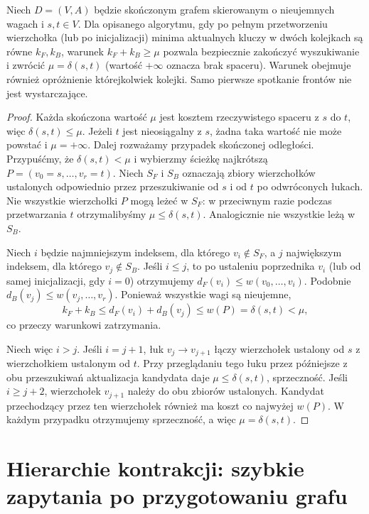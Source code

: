 \begin{stwierdzenie}
\label{prop:tg-weighted-bidir}
Niech $D=(V,A)$ będzie skończonym grafem skierowanym
o nieujemnych wagach i $s,t\in V$.
Dla opisanego algorytmu, gdy po pełnym przetworzeniu
wierzchołka (lub po inicjalizacji) minima aktualnych
kluczy w dwóch kolejkach są równe $k_F,k_B$,
warunek $k_F+k_B\geq\mu$
pozwala bezpiecznie
zakończyć wyszukiwanie
i zwrócić $\mu=\delta(s,t)$ (wartość $+\infty$
oznacza brak spaceru). Warunek obejmuje również
opróżnienie którejkolwiek kolejki.
Samo pierwsze spotkanie
frontów nie jest wystarczające.
\end{stwierdzenie}
\begin{proof}
Każda skończona wartość $\mu$ jest kosztem rzeczywistego
spaceru z $s$ do $t$, więc $\delta(s,t)\leq\mu$.
Jeżeli $t$ jest nieosiągalny z $s$, żadna taka wartość
nie może powstać i $\mu=+\infty$. Dalej rozważamy
przypadek skończonej odległości.
Przypuśćmy, że $\delta(s,t)<\mu$ i wybierzmy
ścieżkę najkrótszą $P=(v_0=s,\ldots,v_r=t)$.
Niech $S_F$ i $S_B$ oznaczają zbiory wierzchołków
ustalonych odpowiednio przez przeszukiwanie od $s$
i od $t$ po odwróconych łukach.
Nie wszystkie wierzchołki $P$ mogą leżeć w $S_F$:
w przeciwnym razie podczas przetwarzania $t$
otrzymalibyśmy $\mu\leq\delta(s,t)$.
Analogicznie nie wszystkie leżą w $S_B$.

Niech $i$ będzie najmniejszym indeksem, dla którego
$v_i\notin S_F$, a $j$ największym indeksem, dla
którego $v_j\notin S_B$. Jeśli $i\leq j$, to po
ustaleniu poprzednika $v_i$ (lub od samej inicjalizacji,
gdy $i=0$) otrzymujemy
$d_F(v_i)\leq w(v_0,\ldots,v_i)$.
Podobnie
$d_B(v_j)\leq w(v_j,\ldots,v_r)$.
Ponieważ wszystkie wagi są nieujemne,
\[
k_F+k_B\leq d_F(v_i)+d_B(v_j)
\leq w(P)=\delta(s,t)<\mu,
\]
co przeczy warunkowi zatrzymania.

Niech więc $i>j$. Jeśli $i=j+1$,
łuk $v_j\to v_{j+1}$ łączy wierzchołek
ustalony od $s$ z wierzchołkiem ustalonym
od $t$. Przy przeglądaniu tego łuku
przez późniejsze z obu przeszukiwań
aktualizacja kandydata daje
$\mu\leq\delta(s,t)$, sprzeczność.
Jeśli $i\geq j+2$, wierzchołek $v_{j+1}$
należy do obu zbiorów ustalonych.
Kandydat przechodzący przez ten wierzchołek
również ma koszt co najwyżej $w(P)$.
W każdym przypadku otrzymujemy sprzeczność,
a więc $\mu=\delta(s,t)$.
\end{proof}

\section{Hierarchie kontrakcji: szybkie zapytania po przygotowaniu grafu}
\label{sec:tg-weighted-ch}

